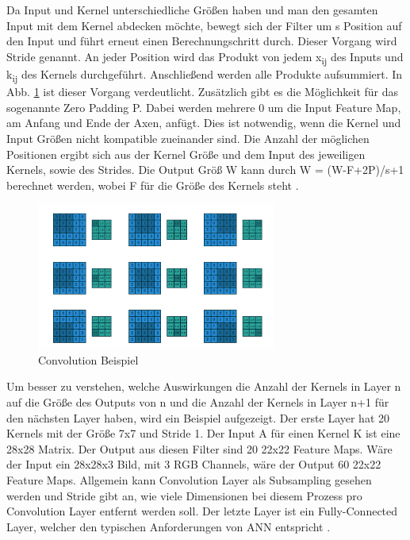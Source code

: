 \documentclass{llncs}
\begin{document}
\\\\
Da Input und Kernel unterschiedliche Größen haben und man den gesamten Input mit dem Kernel abdecken möchte, bewegt sich der Filter um s Position auf den Input und führt erneut einen Berechnungschritt durch. Dieser Vorgang wird Stride genannt. An jeder Position wird das Produkt von jedem x\textsubscript{ij} des Inputs und k\textsubscript{ij} des Kernels durchgeführt.  Anschließend werden alle Produkte aufsummiert. In Abb. \ref{fig:Bild11} ist dieser Vorgang verdeutlicht. Zusätzlich gibt es die Möglichkeit für das sogenannte Zero Padding P. Dabei werden mehrere 0 um die Input Feature Map, am Anfang und Ende der Axen, anfügt. Dies ist notwendig, wenn die Kernel und Input Größen nicht kompatible zueinander sind. Die Anzahl der möglichen Positionen ergibt sich aus der Kernel Größe und dem Input des jeweiligen Kernels, sowie des Strides. Die Output Größ W kann durch W = (W-F+2P)/s+1 berechnet werden, wobei F für die Größe des Kernels steht \cite{conv}.
\pagebreak\linebreak 
\begin{figure}
	\centering
	\includegraphics[width=0.7\textwidth]{conv.png}
	\caption{Convolution Beispiel\protect\cite{conv}}
	\label{fig:Bild11}
\end{figure}
Um  besser zu verstehen, welche Auswirkungen die Anzahl der Kernels in Layer n auf die Größe des Outputs von n und die Anzahl der Kernels in Layer n+1 für den nächsten Layer haben, wird ein Beispiel aufgezeigt. Der erste Layer hat 20 Kernels mit der Größe 7x7 und Stride 1. Der Input A für einen Kernel K ist eine 28x28 Matrix. Der Output aus diesen Filter sind 20 22x22 Feature Maps. Wäre der Input ein 28x28x3 Bild, mit 3 RGB Channels, wäre der Output 60 22x22 Feature Maps. Allgemein kann Convolution Layer als Subsampling gesehen werden und Stride gibt an, wie viele Dimensionen bei diesem Prozess pro Convolution Layer entfernt werden soll. Der letzte Layer ist ein Fully-Connected Layer, welcher den typischen Anforderungen von ANN entspricht \cite{conv}.  
\end{document}
